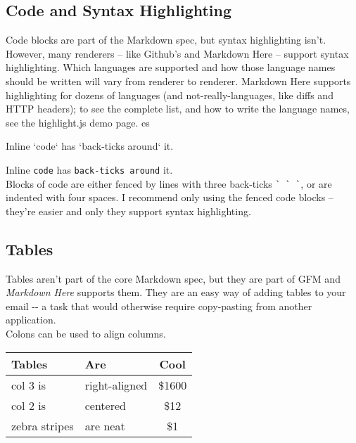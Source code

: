 \documentclass[a4paper, 11pt]{gfm}
\begin{document}
\subsection{Code and Syntax Highlighting}

Code blocks are part of the Markdown spec, but syntax highlighting isn't. However, many renderers -- like Github's and Markdown Here -- support syntax highlighting. Which languages are supported and how those language names should be written will vary from renderer to renderer. Markdown Here supports highlighting for dozens of languages (and not-really-languages, like diffs and HTTP headers); to see the complete list, and how to write the language names, see the highlight.js demo page.
es
\begin{mdframed}
Inline `code` has `back-ticks around` it.
\end{mdframed}

Inline \lstinline{code} has \lstinline{back-ticks around} it. \\

Blocks of code are either fenced by lines with three back-ticks \lstinline{` ` `}, or are indented with four spaces. I recommend only using the fenced code blocks -- they're easier and only they support syntax highlighting.


\subsection{Tables}

Tables aren't part of the core Markdown spec, but they are part of GFM and \textit{Markdown Here} supports them. They are an easy way of adding tables to your email -{-} a task that would otherwise require copy-pasting from another application. \\

Colons can be used to align columns. \\

\begin{tabular}{|p{3cm}|p{3cm}|c|}
\hline
\textbf{Tables} & \textbf{Are} & \textbf{Cool} \\
\hline
col 3 is &  right-aligned & \$1600 \\
\hline
col 2 is &  centered & \$12 \\
\hline
zebra stripes &  are neat & \$1 \\
\hline
\end{tabular}

\vspace{0.5cm}
\end{document}

